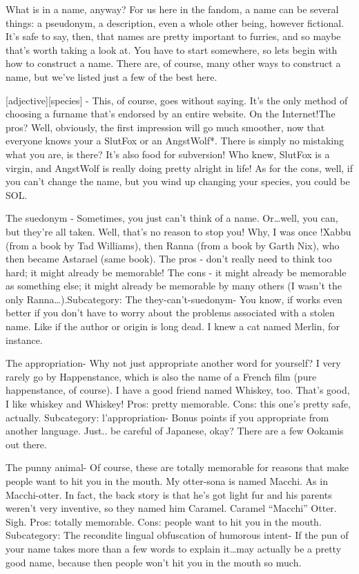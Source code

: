 
What is in a name, anyway? For us here in the fandom, a name can be several things: a pseudonym, a description, even a whole other being, however fictional. It's safe to say, then, that names are pretty important to furries, and so maybe that's worth taking a look at. You have to start somewhere, so lets begin with how to construct a name. There are, of course, many other ways to construct a name, but we've listed just a few of the best here.

{[}adjective{]}{[}species{]} - This, of course, goes without saying. It's the only method of choosing a furname that's endorsed by an entire website. On the Internet!The pros? Well, obviously, the first impression will go much smoother, now that everyone knows your a SlutFox or an AngstWolf*. There is simply no mistaking what you are, is there? It's also food for subversion! Who knew, SlutFox is a virgin, and AngstWolf is really doing pretty alright in life! As for the cons, well, if you can't change the name, but you wind up changing your species, you could be SOL.

The suedonym - Sometimes, you just can't think of a name. Or\ldots{}well, you can, but they're all taken. Well, that's no reason to stop you! Why, I was once !Xabbu (from a book by Tad Williams), then Ranna (from a book by Garth Nix), who then became Astarael (same book). The pros - don't really need to think too hard; it might already be memorable! The cons - it might already be memorable as something else; it might already be memorable by many others (I wasn't the only Ranna\ldots{}).Subcategory: The they-can't-suedonym- You know, if works even better if you don't have to worry about the problems associated with a stolen name. Like if the author or origin is long dead. I knew a cat named Merlin, for instance.

The appropriation- Why not just appropriate another word for yourself? I very rarely go by Happenstance, which is also the name of a French film (pure happenstance, of course). I have a good friend named Whiskey, too. That's good, I like whiskey and Whiskey! Pros: pretty memorable. Cons: this one's pretty safe, actually. Subcategory: l'appropriation- Bonus points if you appropriate from another language. Just.. be careful of Japanese, okay? There are a few Ookamis out there.

The punny animal- Of course, these are totally memorable for reasons that make people want to hit you in the mouth. My otter-sona is named Macchi. As in Macchi-otter. In fact, the back story is that he's got light fur and his parents weren't very inventive, so they named him Caramel. Caramel ``Macchi'' Otter. Sigh. Pros: totally memorable. Cons: people want to hit you in the mouth. Subcategory: The recondite lingual obfuscation of humorous intent- If the pun of your name takes more than a few words to explain it\ldots{}may actually be a pretty good name, because then people won't hit you in the mouth so much.

